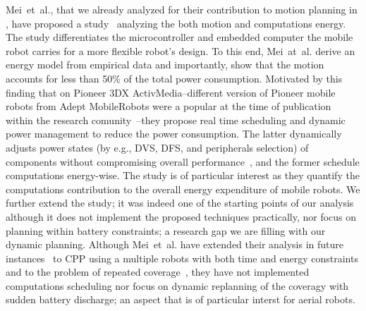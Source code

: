 Mei~et~al., that we already analyzed for their contribution to motion planning in , have proposed a study~\citep{mei2005case} analyzing the both motion and computations energy. The study differentiates the microcontroller and embedded computer the mobile robot carries for a more flexible robot's design. To this end, Mei~at~al. derive an energy model from empirical data and importantly, show that the motion accounts for less than 50\% of the total power consumption. Motivated by this finding that on Pioneer 3DX ActivMedia--different version of Pioneer mobile robots from Adept MobileRobots were a popular at the time of publication within the research comunity~\citep{erickson2003nonlearning,anguelov2004detecting,lemmay2004autonomous}--they propose real time scheduling and dynamic power management to reduce the power consumption. The latter dynamically adjusts power states (by e.g., DVS, DFS, and peripherals selection) of components without compromising overall performance~\citep{mei2005case}, and the former schedule computations energy-wise. 
The study is of particular interest as they quantify the computations contribution to the overall energy expenditure of mobile robots. We further extend the study; it was indeed one of the starting points of our analysis although it does not implement the proposed techniques practically, nor focus on planning within battery constraints; a research gap we are filling with our dynamic planning. Although Mei~et~al. have extended their analysis in future instances~\citep{mei2006deployment,mei2005reducing,mei2005deployment} to CPP using a multiple robots with both time and energy constraints and to the problem of repeated coverage~\citep{mei2006energy}, they have not implemented computations scheduling nor focus on dynamic replanning of the coveragy with sudden battery discharge; an aspect that is of particular interst for aerial robots.

